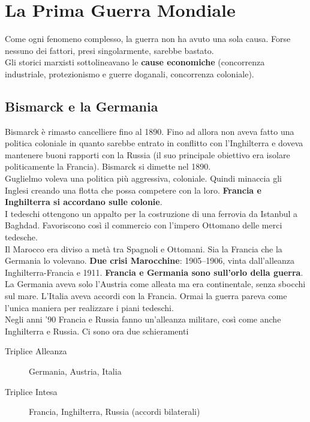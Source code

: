 
\section{La Prima Guerra Mondiale}
Come ogni fenomeno complesso, la guerra non ha avuto una sola causa. Forse nessuno dei fattori, presi
singolarmente, sarebbe bastato.\\
Gli storici marxisti sottolineavano le \textbf{cause economiche} (concorrenza industriale, 
protezionismo e guerre doganali, concorrenza coloniale).\\

\subsection{Bismarck e la Germania}
Bismarck è rimasto cancelliere fino al 1890. Fino ad allora non aveva fatto una politica coloniale
in quanto sarebbe entrato in conflitto con l'Inghilterra e doveva mantenere buoni rapporti con la
Russia (il suo principale obiettivo era isolare politicamente la Francia). Bismarck si dimette nel
1890.\\
Guglielmo  voleva una politica più aggressiva, coloniale. Quindi minaccia gli Inglesi creando
una flotta che possa competere con la loro. \textbf{Francia e Inghilterra si accordano sulle
colonie}.\\
I tedeschi ottengono un appalto per la costruzione di una ferrovia da Istanbul a Baghdad. Favoriscono
così il commercio con l'impero Ottomano delle merci tedesche.\\
Il Marocco era diviso a metà tra Spagnoli e Ottomani. Sia la Francia che la Germania lo volevano.
\textbf{Due crisi Marocchine}: 1905--1906, vinta dall'alleanza Inghilterra-Francia e 1911. 
\textbf{Francia e Germania sono sull'orlo della guerra}.\\
La Germania aveva solo l'Austria come alleata ma era continentale, senza sbocchi sul mare. L'Italia
aveva accordi con la Francia. Ormai la guerra pareva come l'unica maniera per realizzare i piani
tedeschi.\\ [\baselineskip]
Negli anni '90 Francia e Russia fanno un'alleanza militare, così come anche Inghilterra e Russia.
Ci sono ora due schieramenti
\begin{description}
  \item[Triplice Alleanza] Germania, Austria, Italia
  \item[Triplice Intesa] Francia, Inghilterra, Russia (accordi bilaterali)
\end{description}


